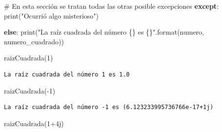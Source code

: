 \documentclass[
  spanish,
  letterpaper,
]{scrbook}
\newenvironment{Shaded}{\begin{snugshade}}{\end{snugshade}}
\newcommand{\BuiltInTok}[1]{\textcolor[rgb]{0.00,0.23,0.31}{#1}}
\newcommand{\CommentTok}[1]{\textcolor[rgb]{0.37,0.37,0.37}{#1}}
\newcommand{\ControlFlowTok}[1]{\textcolor[rgb]{0.00,0.23,0.31}{\textbf{#1}}}
\newcommand{\DecValTok}[1]{\textcolor[rgb]{0.68,0.00,0.00}{#1}}
\newcommand{\NormalTok}[1]{\textcolor[rgb]{0.00,0.23,0.31}{#1}}
\newcommand{\OperatorTok}[1]{\textcolor[rgb]{0.37,0.37,0.37}{#1}}
\newcommand{\OtherTok}[1]{\textcolor[rgb]{0.00,0.23,0.31}{#1}}
\newcommand{\SpecialCharTok}[1]{\textcolor[rgb]{0.37,0.37,0.37}{#1}}
\newcommand{\StringTok}[1]{\textcolor[rgb]{0.13,0.47,0.30}{#1}}
\theoremstyle{definition}
\theoremstyle{remark}
\begin{document}
\begin{Shaded}
\begin{Highlighting}[]
    \CommentTok{\# En esta sección se tratan todas las otras posible excepciones}
    \ControlFlowTok{except}\NormalTok{:}
        \BuiltInTok{print}\NormalTok{(}\StringTok{"Ocurrió algo misterioso"}\NormalTok{)}

    \ControlFlowTok{else}\NormalTok{:}
        \BuiltInTok{print}\NormalTok{(}\StringTok{"La raíz cuadrada del número }\SpecialCharTok{\{\}}\StringTok{ es }\SpecialCharTok{\{\}}\StringTok{"}\NormalTok{.}\BuiltInTok{format}\NormalTok{(numero, numero\_cuadrado))}
\end{Highlighting}
\end{Shaded}

\begin{Shaded}
\begin{Highlighting}[]
\NormalTok{raizCuadrada(}\DecValTok{1}\NormalTok{)}
\end{Highlighting}
\end{Shaded}

\begin{verbatim}
La raíz cuadrada del número 1 es 1.0
\end{verbatim}

\begin{Shaded}
\begin{Highlighting}[]
\NormalTok{raizCuadrada(}\OperatorTok{{-}}\DecValTok{1}\NormalTok{)}
\end{Highlighting}
\end{Shaded}

\begin{verbatim}
La raíz cuadrada del número -1 es (6.123233995736766e-17+1j)
\end{verbatim}

\begin{Shaded}
\begin{Highlighting}[]
\NormalTok{raizCuadrada(}\DecValTok{1}\OperatorTok{+}\OtherTok{4j}\NormalTok{)}
\end{Highlighting}
\end{Shaded}
\end{document}
